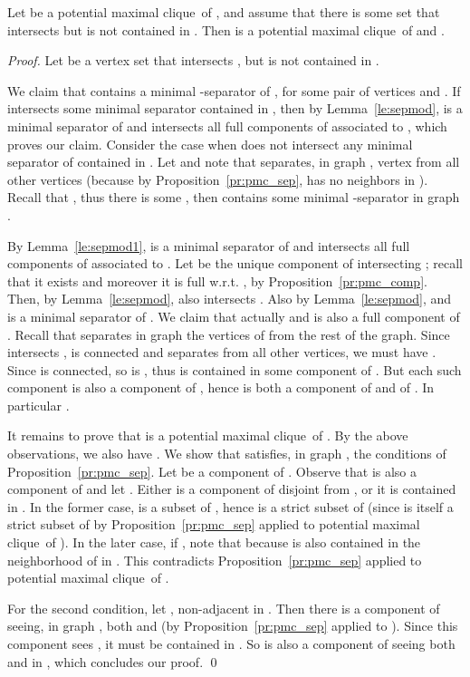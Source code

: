 \documentclass{llncs}
\newcommand{\pmc}{potential maximal clique}
\begin{document}
\begin{lemma}\label{le:pmcmod}
Let  be a \pmc\ of , and assume that there is some set  that intersects  but is not contained in . Then  is a \pmc\ of  and .
\end{lemma}
\begin{proof}
Let  be a vertex set that intersects , but is not contained in . 

We claim that  contains a minimal -separator of , for some pair of vertices  and . If  intersects some minimal separator  contained in , then by Lemma~\ref{le:sepmod},  is a minimal separator of  and  intersects all full components of  associated to , which proves our claim. Consider the case when  does not intersect any minimal separator of  contained in . Let  and note that  separates, in graph , vertex  from all other vertices (because by Proposition~\ref{pr:pmc_sep},  has no neighbors in ). Recall that , thus there is some , then  contains some minimal -separator  in graph .


By Lemma~\ref{le:sepmod1},  is a minimal separator of  and  intersects all full components of  associated to . Let  be the unique component of  intersecting ; recall that it exists and moreover it is full w.r.t. , by Proposition~\ref{pr:pmc_comp}. Then, by Lemma~\ref{le:sepmod},  also intersects . Also by Lemma~\ref{le:sepmod},  and  is a minimal separator of . We claim that actually  and  is also a full component of . Recall that  separates in graph  the vertices of  from the rest of the graph. Since  intersects ,  is connected and  separates  from all other vertices, we must have . Since  is connected, so is , thus  is contained in some component of . But each such component is also a component of , hence  is both a component of  and of . In particular .

It remains to prove that   is a \pmc\ of . By the above observations, we also have . We show that  satisfies, in graph , the conditions of Proposition~\ref{pr:pmc_sep}. Let  be a component of . Observe that  is also a component of  and let . Either  is a component of  disjoint from , or it is contained in . In the former case,  is a subset of , hence  is a strict subset of  (since  is itself a strict subset of  by Proposition~\ref{pr:pmc_sep} applied to \pmc\  of ). In the later case, if , note that  because  is also contained in the neighborhood of  in . This contradicts Proposition~\ref{pr:pmc_sep} applied to \pmc\  of .

For the second condition, let , non-adjacent in . Then there is a component  of  seeing, in graph , both  and  (by Proposition~\ref{pr:pmc_sep} applied to ). Since this component sees , it must be contained in . So  is also a component of  seeing both  and  in , which concludes our proof.
\qed
\end{proof}
\end{document}
